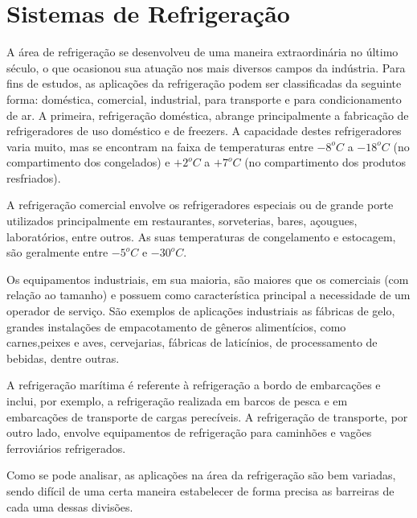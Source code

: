 	\section{Sistemas de Refrigeração}
	A área de refrigeração se desenvolveu de uma maneira extraordinária no último século, o que ocasionou sua atuação nos mais diversos campos da indústria. Para fins de estudos, as aplicações da refrigeração podem ser classificadas da seguinte forma: doméstica, comercial, industrial, para transporte e para condicionamento de ar. A primeira, refrigeração doméstica, abrange principalmente a fabricação de refrigeradores de uso doméstico e de freezers. A capacidade destes refrigeradores varia muito, mas se encontram na faixa de temperaturas entre $-8^oC$ a $-18^oC$ (no compartimento dos congelados) e $+2^oC$ a $+7^oC$ (no compartimento dos produtos resfriados).
	
	A refrigeração comercial envolve os refrigeradores especiais ou de grande porte utilizados principalmente em restaurantes, sorveterias, bares, açougues, laboratórios, entre outros. As suas temperaturas de congelamento e estocagem, são geralmente entre $-5^oC$ e $-30^oC$. 
	
	Os equipamentos industriais, em sua maioria, são maiores que os comerciais (com relação ao tamanho) e possuem como característica principal a necessidade de um operador de serviço. São exemplos de aplicações industriais as fábricas de gelo, grandes instalações de empacotamento de gêneros alimentícios, como carnes,peixes e aves, cervejarias, fábricas de laticínios, de processamento de bebidas, dentre outras.
	
	A refrigeração marítima é referente à refrigeração a bordo de embarcações e inclui, por exemplo, a refrigeração realizada em barcos de pesca e em embarcações de transporte de cargas perecíveis. A refrigeração de transporte,  por outro lado, envolve equipamentos de refrigeração para caminhões e vagões ferroviários refrigerados.
	
	Como se pode analisar, as aplicações na área da refrigeração são bem variadas, sendo difícil de uma certa maneira estabelecer de forma precisa as barreiras de cada uma dessas divisões.
	
